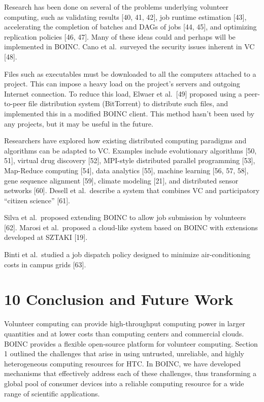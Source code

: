 \documentclass[
]{article}
\begin{document}
Research has been done on several of the problems underlying volunteer
computing, such as validating results {[}40, 41, 42{]}, job runtime
estimation {[}43{]}, accelerating the completion of batches and DAGs of
jobs {[}44, 45{]}, and optimizing replication policies {[}46, 47{]}.
Many of these ideas could and perhaps will be implemented in BOINC. Cano
et al.~surveyed the security issues inherent in VC {[}48{]}.

Files such as executables must be downloaded to all the computers
attached to a project. This can impose a heavy load on the project's
servers and outgoing Internet connection. To reduce this load, Elwaer et
al.~{[}49{]} proposed using a peer-to-peer file distribution system
(BitTorrent) to distribute such files, and implemented this in a
modified BOINC client. This method hasn't been used by any projects, but
it may be useful in the future.

Researchers have explored how existing distributed computing paradigms
and algorithms can be adapted to VC. Examples include evolutionary
algorithms {[}50, 51{]}, virtual drug discovery {[}52{]}, MPI-style
distributed parallel programming {[}53{]}, Map-Reduce computing
{[}54{]}, data analytics {[}55{]}, machine learning {[}56, 57, 58{]},
gene sequence alignment {[}59{]}, climate modeling {[}21{]}, and
distributed sensor networks {[}60{]}. Desell et al.~describe a system
that combines VC and participatory ``citizen science'' {[}61{]}.

Silva et al.~proposed extending BOINC to allow job submission by
volunteers {[}62{]}. Marosi et al.~proposed a cloud-like system based on
BOINC with extensions developed at SZTAKI {[}19{]}.

Binti et al.~studied a job dispatch policy designed to minimize
air-conditioning costs in campus grids {[}63{]}.

\section{10 Conclusion and Future
Work}\label{conclusion-and-future-work}

Volunteer computing can provide high-throughput computing power in
larger quantities and at lower costs than computing centers and
commercial clouds. BOINC provides a flexible open-source platform for
volunteer computing. Section 1 outlined the challenges that arise in
using untrusted, unreliable, and highly heterogeneous computing
resources for HTC. In BOINC, we have developed mechanisms that
effectively address each of these challenges, thus transforming a global
pool of consumer devices into a reliable computing resource for a wide
range of scientific applications.
\end{document}
